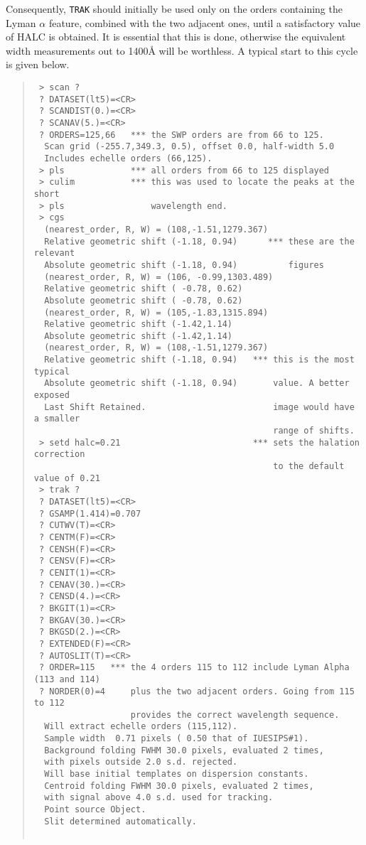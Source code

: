 Consequently, {\tt TRAK} should initially be used only on the orders 
containing the Lyman $\alpha$ feature, combined with the two adjacent ones, 
until a satisfactory value of HALC is obtained. It is essential that this
is done, otherwise the equivalent width measurements out to 1400{\AA} will
be worthless. A typical start to this cycle is given below. 
\begin{quote}
\begin{verbatim}
 > scan ?
 ? DATASET(lt5)=<CR> 
 ? SCANDIST(0.)=<CR> 
 ? SCANAV(5.)=<CR> 
 ? ORDERS=125,66   *** the SWP orders are from 66 to 125. 
  Scan grid (-255.7,349.3, 0.5), offset 0.0, half-width 5.0
  Includes echelle orders (66,125).
 > pls             *** all orders from 66 to 125 displayed
 > culim           *** this was used to locate the peaks at the short 
 > pls                 wavelength end. 
 > cgs
  (nearest_order, R, W) = (108,-1.51,1279.367)
  Relative geometric shift (-1.18, 0.94)      *** these are the relevant 
  Absolute geometric shift (-1.18, 0.94)          figures
  (nearest_order, R, W) = (106, -0.99,1303.489)
  Relative geometric shift ( -0.78, 0.62)
  Absolute geometric shift ( -0.78, 0.62)
  (nearest_order, R, W) = (105,-1.83,1315.894)
  Relative geometric shift (-1.42,1.14)
  Absolute geometric shift (-1.42,1.14)
  (nearest_order, R, W) = (108,-1.51,1279.367)
  Relative geometric shift (-1.18, 0.94)   *** this is the most typical 
  Absolute geometric shift (-1.18, 0.94)       value. A better exposed 
  Last Shift Retained.                         image would have a smaller   
                                               range of shifts.
 > setd halc=0.21                          *** sets the halation correction
                                               to the default value of 0.21
 > trak ?
 ? DATASET(lt5)=<CR> 
 ? GSAMP(1.414)=0.707
 ? CUTWV(T)=<CR> 
 ? CENTM(F)=<CR> 
 ? CENSH(F)=<CR> 
 ? CENSV(F)=<CR> 
 ? CENIT(1)=<CR> 
 ? CENAV(30.)=<CR> 
 ? CENSD(4.)=<CR> 
 ? BKGIT(1)=<CR> 
 ? BKGAV(30.)=<CR> 
 ? BKGSD(2.)=<CR> 
 ? EXTENDED(F)=<CR> 
 ? AUTOSLIT(T)=<CR> 
 ? ORDER=115   *** the 4 orders 115 to 112 include Lyman Alpha (113 and 114)
 ? NORDER(0)=4     plus the two adjacent orders. Going from 115 to 112
                   provides the correct wavelength sequence. 
  Will extract echelle orders (115,112).
  Sample width  0.71 pixels ( 0.50 that of IUESIPS#1).
  Background folding FWHM 30.0 pixels, evaluated 2 times,
  with pixels outside 2.0 s.d. rejected.
  Will base initial templates on dispersion constants.
  Centroid folding FWHM 30.0 pixels, evaluated 2 times,
  with signal above 4.0 s.d. used for tracking.
  Point source Object.
  Slit determined automatically.


\end{verbatim}
\end{quote}
